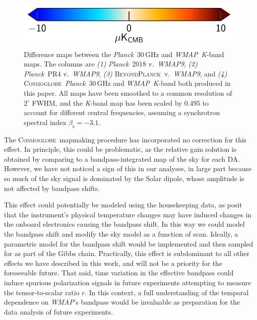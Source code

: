 \documentclass[twocolumn]{../../common/aa}
\def\WMAP{\emph{WMAP}}
\def\WMAPnine{\emph{WMAP9}}
\def\Planck{\emph{Planck}}
\newcommand{\BP}{\textsc{BeyondPlanck}}
\newcommand{\cosmoglobe}{\textsc{Cosmoglobe}}
\newcommand{\K}[0]{\textit K}
\begin{document}
\begin{figure}
        \hspace*{40mm}\includegraphics[width=0.25\textheight]{figures/cbar_10uK.pdf}
	\caption{Difference maps between the \Planck\ 30\,GHz and \WMAP\ \K-band maps. The columns are \textit{(1)} \Planck\ 2018 v.~\WMAPnine, \textit{(2)} \Planck\ PR4 v.~\WMAPnine, \textit{(3)} \BP\ v.~\WMAPnine, and \textit{(4)} \cosmoglobe\ \Planck\ 30\,GHz and \WMAP\ \K-band both produced in this paper. All maps have been smoothed to a common resolution of $2^\circ$ FWHM, and the \K-band map has been scaled by $0.495$ to account for different central frequencies, assuming a synchrotron spectral index $\beta_\mathrm s=-3.1$.}
	\label{fig:diff_history}
\end{figure}

The \cosmoglobe\ mapmaking procedure has incorporated no correction for this effect. In principle, this could be problematic, as the relative gain solution is obtained by comparing to a bandpass-integrated map of the sky for each DA. However, we have not noticed a sign of this in our analyses, in large part because so much of the sky signal is dominated by the Solar dipole, whose amplitude is not affected by bandpass shifts.

This effect could potentially be modeled using the housekeeping data, as \citet{bennett2012} posit that the instrument's physical temperature changes may have induced changes in the onboard electronics causing the bandpass shift. In this way we could model the bandpass shift and modify the sky model as a function of scan. Ideally, a parametric model for the bandpass shift would be implemented and then sampled for as part of the Gibbs chain. Practically, this effect is subdominant to all other effects we have described in this work, and will not be a priority for the foreseeable future. That said, time variation in the effective bandpass could induce spurious polarization signals in future experiments attempting to measure the tensor-to-scalar ratio $r$. In this context, a full understanding of the temporal dependence on \WMAP's bandpass would be invaluable as preparation for the data analysis of future experiments.
\end{document}
